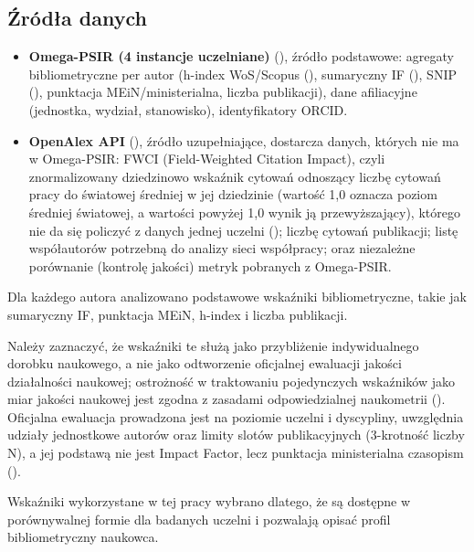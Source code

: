\documentclass[
  polish,
  12pt,
  a4paper,
]{article}
\begin{document}
\subsection{Źródła danych}\label{ux17aruxf3dux142a-danych}

\begin{itemize}
\item
  \textbf{Omega-PSIR (4 instancje uczelniane)}
  (),
  źródło podstawowe: agregaty bibliometryczne per autor (h-index
  WoS/Scopus (), sumaryczny IF
  (), SNIP
  (), punktacja
  MEiN/ministerialna, liczba publikacji), dane afiliacyjne (jednostka,
  wydział, stanowisko), identyfikatory ORCID.
\item
  \textbf{OpenAlex API} (), źródło uzupełniające, dostarcza danych, których nie ma w
  Omega-PSIR: FWCI (Field-Weighted Citation Impact), czyli
  znormalizowany dziedzinowo wskaźnik cytowań odnoszący liczbę cytowań
  pracy do światowej średniej w jej dziedzinie (wartość 1,0 oznacza
  poziom średniej światowej, a wartości powyżej 1,0 wynik ją
  przewyższający), którego nie da się policzyć z danych jednej uczelni
  (); liczbę cytowań
  publikacji; listę współautorów potrzebną do analizy sieci współpracy;
  oraz niezależne porównanie (kontrolę jakości) metryk pobranych z
  Omega-PSIR.
\end{itemize}

Dla każdego autora analizowano podstawowe wskaźniki bibliometryczne,
takie jak sumaryczny IF, punktacja MEiN, h-index i liczba publikacji.

Należy zaznaczyć, że wskaźniki te służą jako przybliżenie indywidualnego
dorobku naukowego, a nie jako odtworzenie oficjalnej ewaluacji jakości
działalności naukowej; ostrożność w traktowaniu pojedynczych wskaźników
jako miar jakości naukowej jest zgodna z zasadami odpowiedzialnej
naukometrii (). Oficjalna ewaluacja prowadzona jest na poziomie uczelni i
dyscypliny, uwzględnia udziały jednostkowe autorów oraz limity slotów
publikacyjnych (3-krotność liczby N), a jej podstawą nie jest Impact
Factor, lecz punktacja ministerialna czasopism
().

Wskaźniki wykorzystane w tej pracy wybrano dlatego, że są dostępne w
porównywalnej formie dla badanych uczelni i pozwalają opisać profil
bibliometryczny naukowca.
\end{document}
